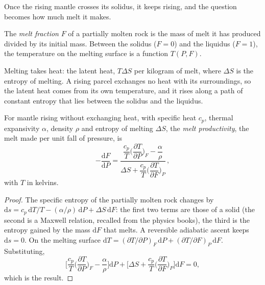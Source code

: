 Once the rising mantle crosses its solidus, it keeps rising, and the question
becomes how much melt it makes.

\begin{definition}\label{def:b2:mantle-melting:fraction}
The \emph{melt fraction} $F$ of a partially molten rock is
the mass of melt it has produced divided by its initial mass. Between the solidus
($F = 0$) and the liquidus ($F = 1$), the temperature on the melting surface is a
function $T(P, F)$.
\end{definition}

Melting takes heat: the latent heat, $T\Delta S$ per kilogram of melt, where
$\Delta S$ is the entropy of melting. A rising parcel exchanges no heat with its
surroundings, so the latent heat comes from its own temperature, and it rises
along a path of constant entropy that lies between the solidus and the liquidus.

\begin{proposition}\label{prop:b2:mantle-melting:productivity}
For mantle rising without exchanging heat, with specific heat $c_p$, thermal
expansivity $\alpha$, density $\rho$ and entropy of melting $\Delta S$, the
\emph{melt productivity}, the melt made per unit fall of
pressure, is
\[
  -\frac{\mathrm dF}{\mathrm dP} =
  \frac{\dfrac{c_p}{T}\Big(\dfrac{\partial T}{\partial P}\Big)_F - \dfrac{\alpha}{\rho}}
       {\Delta S + \dfrac{c_p}{T}\Big(\dfrac{\partial T}{\partial F}\Big)_P}\,,
\]
with $T$ in kelvins.
\end{proposition}

\begin{proof}
The specific entropy of the partially molten rock changes by $\mathrm ds = c_p\,
\mathrm dT/T - (\alpha/\rho)\,\mathrm dP + \Delta S\,\mathrm dF$: the first two
terms are those of a solid (the second is a Maxwell relation, recalled from the
physics books), the third is the entropy gained by the mass $\mathrm dF$ that
melts. A reversible adiabatic ascent keeps $\mathrm ds = 0$. On the melting
surface $\mathrm dT = (\partial T/\partial P)_F\,\mathrm dP + (\partial
T/\partial F)_P\,\mathrm dF$. Substituting,
\[
  \Big[\frac{c_p}{T}\Big(\frac{\partial T}{\partial P}\Big)_F - \frac{\alpha}{\rho}\Big]\mathrm dP
  + \Big[\Delta S + \frac{c_p}{T}\Big(\frac{\partial T}{\partial F}\Big)_P\Big]\mathrm dF = 0,
\]
which is the result.
\end{proof}

